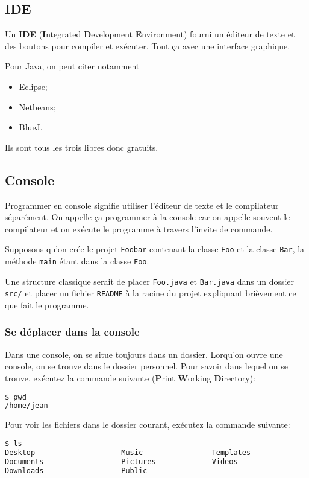 \subsection{IDE}
Un \textbf{IDE} (\textbf{I}ntegrated \textbf{D}evelopment \textbf{E}nvironment)
fourni un éditeur de texte et des boutons pour compiler et exécuter.
Tout ça avec une interface graphique.

Pour Java, on peut citer notamment
\begin{itemize}
  \item Eclipse;
  \item Netbeans;
  \item BlueJ.
\end{itemize}
Ils sont tous les trois libres donc gratuits.

\subsection{Console}
Programmer en console signifie utiliser
l'éditeur de texte et le compilateur séparément.
On appelle ça programmer à la console car on appelle souvent le compilateur
et on exécute le programme à travers l'invite de commande.

Supposons qu'on crée le projet \verb|Foobar| contenant la classe
\verb|Foo| et la classe \verb|Bar|,
la méthode \verb|main| étant dans la classe \verb|Foo|.

Une structure classique serait de placer \verb|Foo.java| et \verb|Bar.java|
dans un dossier \verb|src/| et placer un fichier \verb|README|
à la racine du projet expliquant brièvement ce que fait le programme.

\subsubsection{Se déplacer dans la console}
Dans une console, on se situe toujours dans un dossier.
Lorqu'on ouvre une console, on se trouve dans le dossier personnel.
Pour savoir dans lequel on se trouve,
exécutez la commande suivante
(\textbf{P}rint \textbf{W}orking \textbf{D}irectory):
\begin{lstlisting}[language={sh}]
$ pwd
/home/jean
\end{lstlisting}

Pour voir les fichiers dans le dossier courant, exécutez la commande suivante:
\begin{lstlisting}[language={sh}, morekeywords={ls}]
$ ls
Desktop                    Music                Templates
Documents                  Pictures             Videos
Downloads                  Public
\end{lstlisting}

